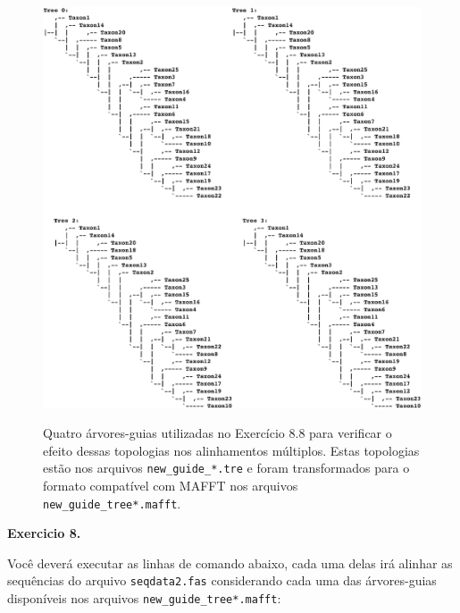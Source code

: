 \begin{refsection}
  \begin{figure}[h!]
      {\includegraphics[scale=0.6]{figures/tut8/guide_trees.eps}}
	{\caption[árvores-guias]{Quatro árvores-guias utilizadas no Exercício 8.8 para verificar o efeito dessas topologias nos alinhamentos múltiplos. Estas topologias estão nos arquivos \texttt{new\_guide\_*.tre} e foram transformados para o formato compatível com MAFFT nos arquivos \texttt{new\_guide\_tree*.mafft}.}\label{tut8:fig:guide_trees}}
  \end{figure}




\begin{blackBlock}{\textbf{Exercicio 8.}}\label{tut8:ex:8.8}

Você deverá executar as linhas de comando abaixo, cada uma delas irá alinhar as sequências do arquivo \texttt{seqdata2.fas} considerando cada uma das árvores-guias disponíveis nos arquivos \texttt{new\_guide\_tree*.mafft}:\\


\end{blackBlock}
\end{refsection}
